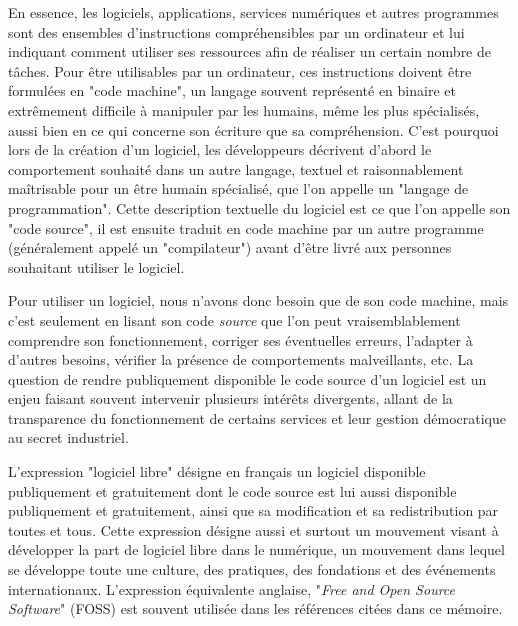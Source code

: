 \documentclass[dvipsnames]{llncs}
\newcommand{\en}[1]{\foreignlanguage{english}{\todo{fix weird hspace}\emph{#1}}}
\begin{document}
    En essence, les logiciels, applications, services numériques et autres
    programmes sont des ensembles d'instructions compréhensibles par un
    ordinateur et lui indiquant comment utiliser ses ressources afin de réaliser
    un certain nombre de tâches. Pour être utilisables par un ordinateur, ces
    instructions doivent être formulées en "code machine", un langage souvent
    représenté en binaire et extrêmement difficile à manipuler par les humains,
    même les plus spécialisés, aussi bien en ce qui concerne son écriture que sa
    compréhension. C'est pourquoi lors de la création d'un logiciel, les
    développeurs décrivent d'abord le comportement souhaité dans un autre
    langage, textuel et raisonnablement maîtrisable pour un être humain
    spécialisé, que l'on appelle un "langage de programmation". Cette
    description textuelle du logiciel est ce que l'on appelle son "code source",
    il est ensuite traduit en code machine par un autre programme (généralement
    appelé un "compilateur") avant d'être livré aux personnes souhaitant
    utiliser le logiciel.

    Pour utiliser un logiciel, nous n'avons donc besoin que de son code machine,
    mais c'est seulement en lisant son code \emph{source} que l'on peut
    vraisemblablement comprendre son fonctionnement, corriger ses éventuelles
    erreurs, l'adapter à d'autres besoins, vérifier la présence de comportements
    malveillants, etc. La question de rendre publiquement disponible le code
    source d'un logiciel est un enjeu faisant souvent intervenir plusieurs
    intérêts divergents, allant de la transparence du fonctionnement de certains
    services et leur gestion démocratique au secret industriel.

    L'expression "logiciel libre" désigne en français un logiciel disponible
    publiquement et gratuitement dont le code source est lui aussi disponible
    publiquement et gratuitement, ainsi que sa modification et sa redistribution
    par toutes et tous. Cette expression désigne aussi et surtout un mouvement
    visant à développer la part de logiciel libre dans le numérique, un
    mouvement dans lequel se développe toute une culture, des pratiques, des
    fondations et des événements internationaux. L'expression équivalente
    anglaise, "\en{Free and Open Source Software}" (FOSS) est souvent utilisée
    dans les références citées dans ce mémoire.
\end{document}

